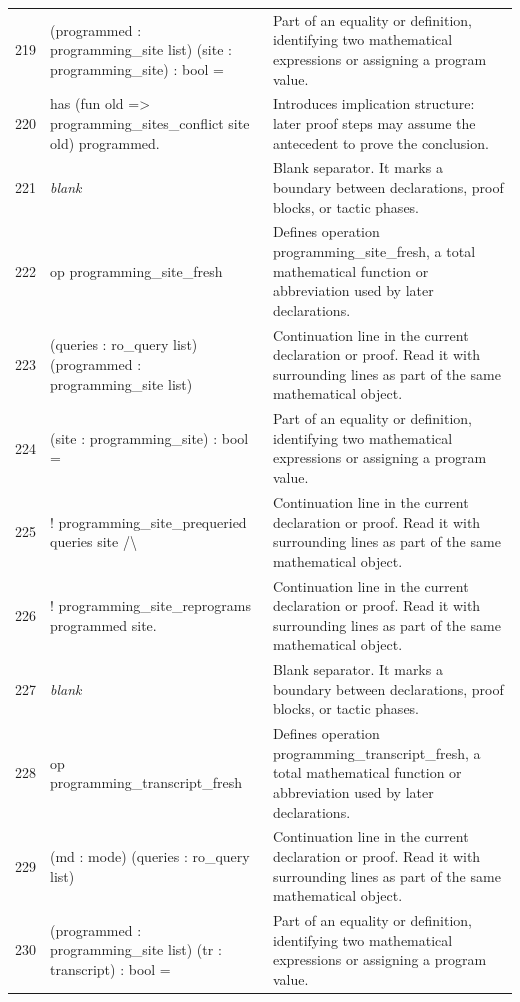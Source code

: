 \documentclass[10pt]{article}
\begin{document}
\begin{longtable}{r L{0.53\textwidth} L{0.37\textwidth}}
219 & {\ttfamily\scriptsize    (programmed : programming\_site list) (site : programming\_site) : bool =} & Part of an equality or definition, identifying two mathematical expressions or assigning a program value. \\
220 & {\ttfamily\scriptsize   has (fun old => programming\_sites\_conflict site old) programmed.} & Introduces implication structure: later proof steps may assume the antecedent to prove the conclusion. \\
221 & {\ttfamily\scriptsize \emph{blank}} & Blank separator.  It marks a boundary between declarations, proof blocks, or tactic phases. \\
222 & {\ttfamily\scriptsize op programming\_site\_fresh} & Defines operation programming\_site\_fresh, a total mathematical function or abbreviation used by later declarations. \\
223 & {\ttfamily\scriptsize    (queries : ro\_query list) (programmed : programming\_site list)} & Continuation line in the current declaration or proof.  Read it with surrounding lines as part of the same mathematical object. \\
224 & {\ttfamily\scriptsize    (site : programming\_site) : bool =} & Part of an equality or definition, identifying two mathematical expressions or assigning a program value. \\
225 & {\ttfamily\scriptsize   ! programming\_site\_prequeried queries site /\textbackslash{}} & Continuation line in the current declaration or proof.  Read it with surrounding lines as part of the same mathematical object. \\
226 & {\ttfamily\scriptsize   ! programming\_site\_reprograms programmed site.} & Continuation line in the current declaration or proof.  Read it with surrounding lines as part of the same mathematical object. \\
227 & {\ttfamily\scriptsize \emph{blank}} & Blank separator.  It marks a boundary between declarations, proof blocks, or tactic phases. \\
228 & {\ttfamily\scriptsize op programming\_transcript\_fresh} & Defines operation programming\_transcript\_fresh, a total mathematical function or abbreviation used by later declarations. \\
229 & {\ttfamily\scriptsize    (md : mode) (queries : ro\_query list)} & Continuation line in the current declaration or proof.  Read it with surrounding lines as part of the same mathematical object. \\
230 & {\ttfamily\scriptsize    (programmed : programming\_site list) (tr : transcript) : bool =} & Part of an equality or definition, identifying two mathematical expressions or assigning a program value. \\

\end{longtable}
\end{document}
